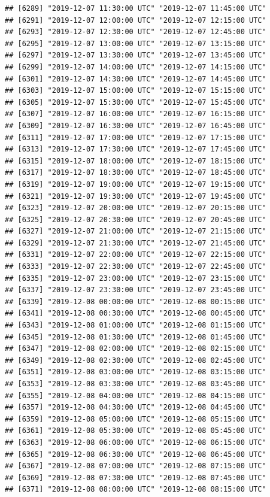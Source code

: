 \documentclass{article}\usepackage[]{graphicx}\usepackage[]{color}
\makeatletter
\newenvironment{kframe}{%
 \def\at@end@of@kframe{}%
 \ifinner\ifhmode%
  \def\at@end@of@kframe{\end{minipage}}%
  \begin{minipage}{\columnwidth}%
 \fi\fi%
 \def\FrameCommand##1{\hskip\@totalleftmargin \hskip-\fboxsep
 \colorbox{shadecolor}{##1}\hskip-\fboxsep
     \hskip-\linewidth \hskip-\@totalleftmargin \hskip\columnwidth}%
 \MakeFramed {\advance\hsize-\width
   \@totalleftmargin\z@ \linewidth\hsize
   \@setminipage}}%
 {\par\unskip\endMakeFramed%
 \at@end@of@kframe}
\newenvironment{knitrout}{}{} %
\makeatother
\begin{document}
\begin{knitrout}
\begin{kframe}
\begin{verbatim}
## [6289] "2019-12-07 11:30:00 UTC" "2019-12-07 11:45:00 UTC"
## [6291] "2019-12-07 12:00:00 UTC" "2019-12-07 12:15:00 UTC"
## [6293] "2019-12-07 12:30:00 UTC" "2019-12-07 12:45:00 UTC"
## [6295] "2019-12-07 13:00:00 UTC" "2019-12-07 13:15:00 UTC"
## [6297] "2019-12-07 13:30:00 UTC" "2019-12-07 13:45:00 UTC"
## [6299] "2019-12-07 14:00:00 UTC" "2019-12-07 14:15:00 UTC"
## [6301] "2019-12-07 14:30:00 UTC" "2019-12-07 14:45:00 UTC"
## [6303] "2019-12-07 15:00:00 UTC" "2019-12-07 15:15:00 UTC"
## [6305] "2019-12-07 15:30:00 UTC" "2019-12-07 15:45:00 UTC"
## [6307] "2019-12-07 16:00:00 UTC" "2019-12-07 16:15:00 UTC"
## [6309] "2019-12-07 16:30:00 UTC" "2019-12-07 16:45:00 UTC"
## [6311] "2019-12-07 17:00:00 UTC" "2019-12-07 17:15:00 UTC"
## [6313] "2019-12-07 17:30:00 UTC" "2019-12-07 17:45:00 UTC"
## [6315] "2019-12-07 18:00:00 UTC" "2019-12-07 18:15:00 UTC"
## [6317] "2019-12-07 18:30:00 UTC" "2019-12-07 18:45:00 UTC"
## [6319] "2019-12-07 19:00:00 UTC" "2019-12-07 19:15:00 UTC"
## [6321] "2019-12-07 19:30:00 UTC" "2019-12-07 19:45:00 UTC"
## [6323] "2019-12-07 20:00:00 UTC" "2019-12-07 20:15:00 UTC"
## [6325] "2019-12-07 20:30:00 UTC" "2019-12-07 20:45:00 UTC"
## [6327] "2019-12-07 21:00:00 UTC" "2019-12-07 21:15:00 UTC"
## [6329] "2019-12-07 21:30:00 UTC" "2019-12-07 21:45:00 UTC"
## [6331] "2019-12-07 22:00:00 UTC" "2019-12-07 22:15:00 UTC"
## [6333] "2019-12-07 22:30:00 UTC" "2019-12-07 22:45:00 UTC"
## [6335] "2019-12-07 23:00:00 UTC" "2019-12-07 23:15:00 UTC"
## [6337] "2019-12-07 23:30:00 UTC" "2019-12-07 23:45:00 UTC"
## [6339] "2019-12-08 00:00:00 UTC" "2019-12-08 00:15:00 UTC"
## [6341] "2019-12-08 00:30:00 UTC" "2019-12-08 00:45:00 UTC"
## [6343] "2019-12-08 01:00:00 UTC" "2019-12-08 01:15:00 UTC"
## [6345] "2019-12-08 01:30:00 UTC" "2019-12-08 01:45:00 UTC"
## [6347] "2019-12-08 02:00:00 UTC" "2019-12-08 02:15:00 UTC"
## [6349] "2019-12-08 02:30:00 UTC" "2019-12-08 02:45:00 UTC"
## [6351] "2019-12-08 03:00:00 UTC" "2019-12-08 03:15:00 UTC"
## [6353] "2019-12-08 03:30:00 UTC" "2019-12-08 03:45:00 UTC"
## [6355] "2019-12-08 04:00:00 UTC" "2019-12-08 04:15:00 UTC"
## [6357] "2019-12-08 04:30:00 UTC" "2019-12-08 04:45:00 UTC"
## [6359] "2019-12-08 05:00:00 UTC" "2019-12-08 05:15:00 UTC"
## [6361] "2019-12-08 05:30:00 UTC" "2019-12-08 05:45:00 UTC"
## [6363] "2019-12-08 06:00:00 UTC" "2019-12-08 06:15:00 UTC"
## [6365] "2019-12-08 06:30:00 UTC" "2019-12-08 06:45:00 UTC"
## [6367] "2019-12-08 07:00:00 UTC" "2019-12-08 07:15:00 UTC"
## [6369] "2019-12-08 07:30:00 UTC" "2019-12-08 07:45:00 UTC"
## [6371] "2019-12-08 08:00:00 UTC" "2019-12-08 08:15:00 UTC"

\end{verbatim}
\end{kframe}
\end{knitrout}
\end{document}
